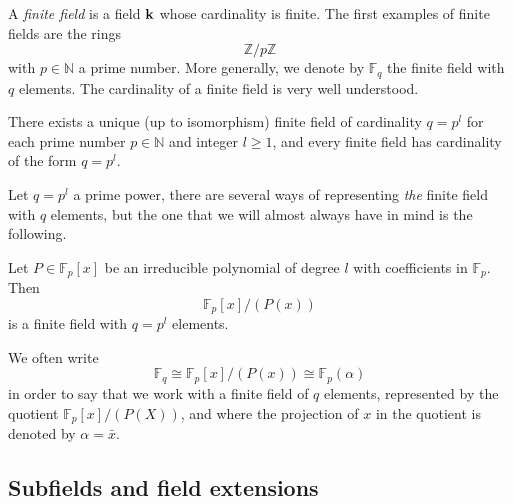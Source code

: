 A \emph{finite field} is a field $\mathbf{k}$ whose cardinality is finite. The first
examples of finite fields are the rings 
\[
  \mathbb{Z}/p\mathbb{Z}
\]
with $p\in\mathbb{N}$ a prime number. More generally, we denote by
$\mathbb{F}_{q}$ the finite field with $q$ elements. The cardinality of a finite
field is very well understood.
\begin{prop}
 There exists a unique (up to isomorphism) finite field of cardinality $q = p^l$
 for each prime number $p\in\mathbb{N}$ and integer $l\geq1$, and every finite
 field has cardinality of the form $q = p^l$.
\end{prop}
Let $q=p^l$ a prime power, there are several ways of representing
\emph{the} finite field with $q$ elements, but the one that we will almost
always have in mind is the following.

\begin{prop}
Let $P\in\mathbb{F}_p[x]$ be an
irreducible polynomial of degree $l$ with coefficients in $\mathbb{F}_p$. Then
\[
  \mathbb{F}_p[x]/(P(x))
\]
is a finite field with $q = p^l$ elements.
\end{prop}
We often write
\[
  \mathbb{F}_q \cong \mathbb{F}_{p}[x]/(P(x))\cong \mathbb{F}_p(\alpha)
\]
in order to say that we work with a finite field of $q$ elements, represented by
the quotient $\mathbb{F}_{p}[x]/(P(X))$, and where the projection of $x$ in the
quotient is denoted by $\alpha=\bar x$.

\subsection{Subfields and field extensions}

